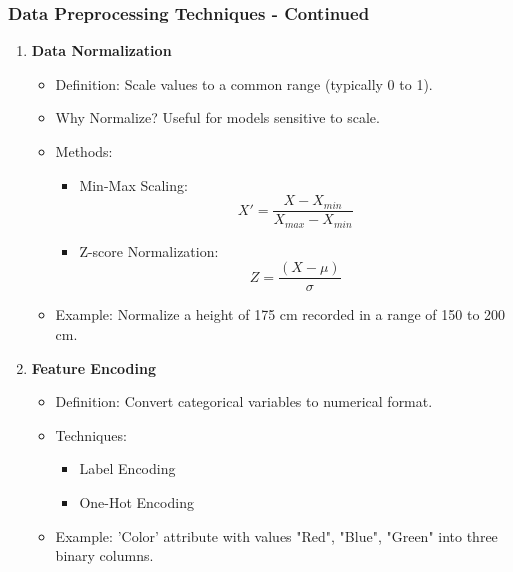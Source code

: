 \documentclass[aspectratio=169]{beamer}
\begin{document}
\begin{frame}[fragile]
    \frametitle{Data Preprocessing Techniques - Continued}
    \begin{enumerate}[resume]
        \item \textbf{Data Normalization}
        \begin{itemize}
            \item Definition: Scale values to a common range (typically 0 to 1).
            \item Why Normalize? Useful for models sensitive to scale.
            \item Methods:
            \begin{itemize}
                \item Min-Max Scaling: 
                \[
                X' = \frac{X - X_{min}}{X_{max} - X_{min}}
                \]
                \item Z-score Normalization: 
                \[
                Z = \frac{(X - \mu)}{\sigma}
                \]
            \end{itemize}
            \item Example: Normalize a height of 175 cm recorded in a range of 150 to 200 cm.
        \end{itemize}

        \item \textbf{Feature Encoding}
        \begin{itemize}
            \item Definition: Convert categorical variables to numerical format.
            \item Techniques:
            \begin{itemize}
                \item Label Encoding
                \item One-Hot Encoding
            \end{itemize}
            \item Example: 'Color' attribute with values "Red", "Blue", "Green" into three binary columns.
        \end{itemize}
    \end{enumerate}
\end{frame}
\end{document}
